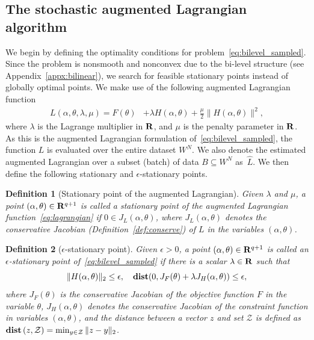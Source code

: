 \documentclass[11pt]{article}
\newtheorem{definition}{Definition}[section]
\newcommand{\bsnote}[1]{\noindent\textcolor{red}{\texttt{Bartolomeo: #1}}}
\begin{document}
\subsection{The stochastic augmented Lagrangian algorithm}
\label{sec:training_procedure}
We begin by defining the optimality conditions for problem~\eqref{eq:bilevel_sampled}. Since the problem is nonsmooth and nonconvex due to the bi-level structure (see Appendix~\ref{appx:bilinear}), we search for feasible stationary points instead of globally optimal points. We make use of the following augmented Lagrangian function 
\begin{equation}
\label{eq:lagrangian}
	\begin{aligned}
		L(\alpha,\theta,\lambda,\mu) = F(\theta) &+ \lambda H(\alpha,\theta) + \frac{\mu}{2}\|H(\alpha,\theta)\|^2,
	\end{aligned}
\end{equation}
where $\lambda$ is the Lagrange multiplier in  ${\mathbf R}$, and $\mu$ is the penalty parameter in ${\mathbf R}$.
As this is the augmented Lagrangian formulation of~\eqref{eq:bilevel_sampled}, the function $L$ is evaluated over the entire dataset $W^N$. 
We also denote the estimated augmented Lagrangian over a subset (batch) of data $B \subseteq W^N$ as~$\hat{L}$.
We then define the following stationary and $\epsilon$-stationary points. 
\begin{definition}[Stationary point of the augmented Lagrangian]
\label{def:stationary_lag}
Given $\lambda$ and $\mu$, a point $(\alpha,\theta)\in {\mathbf R}^{q+1}$ is called a stationary point of the augmented Lagrangian function~\eqref{eq:lagrangian} if $0 \in J_L(\alpha,\theta)$, where $J_L(\alpha,\theta)$ denotes the conservative Jacobian (Definition~\ref{def:conserve}) of $L$ in the variables $(\alpha,\theta)$.
\end{definition}

\begin{definition}[$\epsilon$-stationary point]
\label{def:eps_stationary}
Given $\epsilon > 0$, a point $(\alpha,\theta)\in {\mathbf R}^{q+1}$ is called an $\epsilon$-stationary point of~\eqref{eq:bilevel_sampled} if there is a scalar $\lambda \in {\mathbf R}$ such that
\begin{equation}
\label{eq:stationary}
\|H(\alpha,\theta)\|_2 \leq \epsilon, \quad \mathop{\bf dist{}}(0, J_F(\theta) + \lambda J_{H}(\alpha,\theta)) \leq \epsilon,
\end{equation}
where $J_F(\theta)$ is the conservative Jacobian of the objective function $F$ in the variable $\theta$, $J_{H}(\alpha,\theta)$
denotes the conservative Jacobian of the constraint function in variables $(\alpha,\theta)$, and the distance between a vector $z$ and set $\mathcal{Z}$ is defined as $\mathop{\bf dist{}}{(z,\mathcal{Z})} = \min_{y \in \mathcal{Z}} \| z - y \|_2$.
\end{definition}
\end{document}
